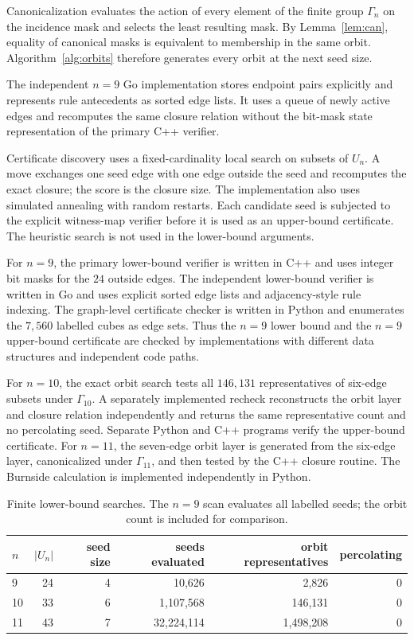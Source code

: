 \documentclass[11pt]{article}
\numberwithin{equation}{section}
\begin{document}
Canonicalization evaluates the action of every element of the finite group
$\Gamma_n$ on the incidence mask and selects the least resulting mask. By
Lemma~\ref{lem:can}, equality of canonical masks is equivalent to membership
in the same orbit. Algorithm~\ref{alg:orbits} therefore generates every orbit
at the next seed size.

The independent $n=9$ Go implementation stores endpoint pairs explicitly and
represents rule antecedents as sorted edge lists. It uses a queue of newly
active edges and recomputes the same closure relation without the bit-mask
state representation of the primary C++ verifier.

Certificate discovery uses a fixed-cardinality local search on subsets of $U_n$. A move exchanges one seed edge with one edge outside the seed and recomputes the exact closure; the score is the closure size. The implementation also uses simulated annealing with random restarts. Each candidate seed is subjected to the explicit witness-map verifier before it is used as an upper-bound certificate. The heuristic search is not used in the lower-bound arguments.

For $n=9$, the primary lower-bound verifier is written in C++ and uses integer bit masks for the $24$ outside edges. The independent lower-bound verifier is written in Go and uses explicit sorted edge lists and adjacency-style rule indexing. The graph-level certificate checker is written in Python and enumerates the $7,560$ labelled cubes as edge sets. Thus the $n=9$ lower bound and the $n=9$ upper-bound certificate are checked by implementations with different data structures and independent code paths.

For $n=10$, the exact orbit search tests all $146,131$ representatives of
six-edge subsets under $\Gamma_{10}$. A separately implemented recheck
reconstructs the orbit layer and closure relation independently and returns
the same representative count and no percolating seed. Separate Python and
C++ programs verify the upper-bound certificate. For $n=11$, the seven-edge orbit layer is generated from the six-edge layer, canonicalized under $\Gamma_{11}$, and then tested by the C++ closure routine. The Burnside calculation is implemented independently in Python.

\begin{table}[t]
\centering
\caption{Finite lower-bound searches. The $n=9$ scan evaluates all labelled
seeds; the orbit count is included for comparison.}
\label{tab:searches}
\begin{tabular}{lrrrrr}
\toprule
$n$ & $|U_n|$ & seed size & seeds evaluated & orbit representatives & percolating \\
\midrule
9  & 24 & 4 & 10,626 & 2,826 & 0 \\
10 & 33 & 6 & 1,107,568 & 146,131 & 0 \\
11 & 43 & 7 & 32,224,114 & 1,498,208 & 0 \\
\bottomrule
\end{tabular}
\end{table}
\end{document}
